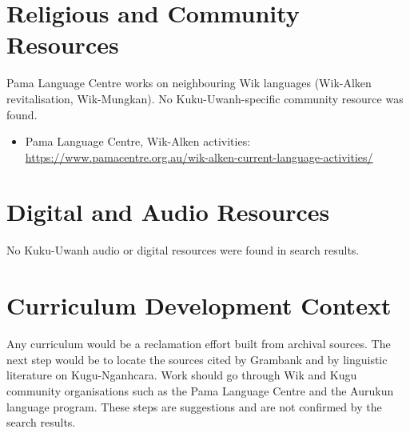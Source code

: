 \documentclass[12pt]{article}
\begin{document}
\section{Religious and Community Resources}
Pama Language Centre works on neighbouring Wik languages (Wik-Alken revitalisation, Wik-Mungkan). No Kuku-Uwanh-specific community resource was found.
\begin{itemize}
\item Pama Language Centre, Wik-Alken activities: \url{https://www.pamacentre.org.au/wik-alken-current-language-activities/}
\end{itemize}

\section{Digital and Audio Resources}
No Kuku-Uwanh audio or digital resources were found in search results.

\section{Curriculum Development Context}
Any curriculum would be a reclamation effort built from archival sources. The next step would be to locate the sources cited by Grambank and by linguistic literature on Kugu-Nganhcara. Work should go through Wik and Kugu community organisations such as the Pama Language Centre and the Aurukun language program. These steps are suggestions and are not confirmed by the search results.
\end{document}
